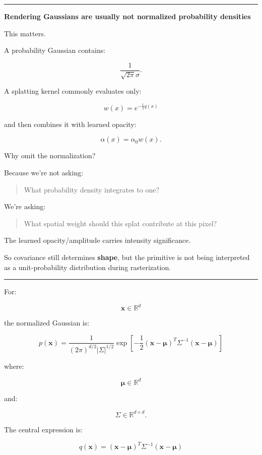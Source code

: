 \begin{center}\rule{0.5\linewidth}{0.5pt}\end{center}

\textbf{Rendering Gaussians are usually not normalized probability densities}

This matters.

A probability Gaussian contains:

\[
\frac{1}{\sqrt{2\pi}\sigma}.
\]

A splatting kernel commonly evaluates only:

\[
\boxed{
w(x)=
e^{-\frac12 q(x)}
}
\]

and then combines it with learned opacity:

\[
\alpha(x)
=
\alpha_0w(x).
\]

Why omit the normalization?

Because we're not asking:

\begin{quote}
What probability density integrates to one?
\end{quote}

We're asking:

\begin{quote}
What spatial weight should this splat contribute at this pixel?
\end{quote}

The learned opacity/amplitude carries intensity significance.

So covariance still determines \textbf{shape}, but the primitive is not being interpreted as a unit-probability distribution during rasterization.

\begin{center}\rule{0.5\linewidth}{0.5pt}\end{center}

For:

\[
\mathbf x\in\mathbb R^d
\]

the normalized Gaussian is:

\[
\boxed{
p(\mathbf x)
=
\frac{
1
}{
(2\pi)^{d/2}
|\Sigma|^{1/2}
}
\exp
\left[
-\frac12
(\mathbf x-\boldsymbol\mu)^T
\Sigma^{-1}
(\mathbf x-\boldsymbol\mu)
\right]
}
\]

where:

\[
\boldsymbol\mu\in\mathbb R^d
\]

and:

\[
\Sigma\in\mathbb R^{d\times d}.
\]

The central expression is:

\[
\boxed{
q(\mathbf x)
=
(\mathbf x-\boldsymbol\mu)^T
\Sigma^{-1}
(\mathbf x-\boldsymbol\mu)
}
\]

